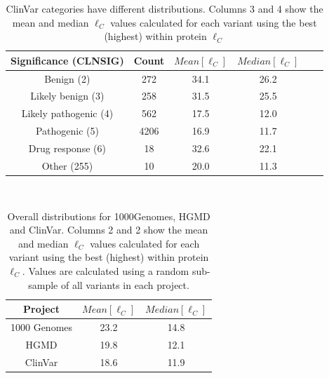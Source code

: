 \begin{center}

\begin{table}[ht]
\centering
\begin{tabular}{|c|c|c|c|c|c|}
\hline 
Significance (CLNSIG)   &   Count  & $Mean[\ell_C]$  &  $Median[\ell_C]$ \\
\hline 
Benign (2)              &    272   &      34.1       &    26.2     \\
Likely benign (3)       &    258   &      31.5       &    25.5     \\
Likely pathogenic (4)   &    562   &      17.5       &    12.0     \\
Pathogenic (5)          &   4206   &      16.9       &    11.7     \\
Drug response (6)       &     18   &      32.6       &    22.1     \\
Other (255)             &     10   &      20.0       &    11.3     \\
\hline 
\end{tabular}
\\
\caption{ClinVar categories have different distributions. Columns 3 and 4 show the mean and median $\ell_C$ values calculated for each variant using the best (highest) within protein $\ell_C$} 
\label{tab:gwas_clinvar}
\end{table}

\begin{table}[ht]
\centering
\begin{tabular}{|c|c|c|}
\hline 
Project      & $Mean[\ell_C]$  &  $Median[\ell_C]$ \\
\hline 
1000 Genomes &            23.2 &          14.8  \\
HGMD         &            19.8 &          12.1  \\
ClinVar      &            18.6 &          11.9  \\
\hline 
\end{tabular} 
\caption{Overall distributions for 1000Genomes, HGMD and ClinVar. Columns 2 and 2 show the mean and median $\ell_C$ values calculated for each variant using the best (highest) within protein $\ell_C$. Values are calculated using a random sub-sample of all variants in each project.}
\label{tab:gwas_1Kg}
\end{table}

\end{center}

\FloatBarrier


